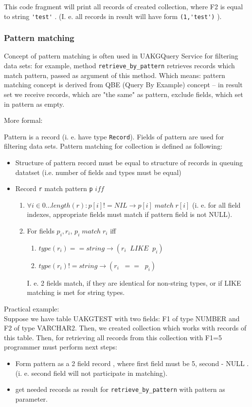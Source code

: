  This code fragment will print all records of created collection, where
F2 is equal to string \verb|'test'| . (I. e. all records in result will
have form \verb|(1,'test')| ).


\subsubsection{ Pattern matching }
 \label{patterns}

 Concept of pattern matching is often used in UAKGQuery Service for filtering
 data sets: for example, method \verb|retrieve_by_pattern| retrieves records
 which  match pattern, passed as argument of this method. Which means:
 pattern matching concept is derived from QBE (Query By Example) concept --
 in result set we receive records, which are "the same" as pattern, exclude
 fields, which set in pattern as empty.

More formal:

 Pattern is a record (i. e. have type \verb|Record|). Fields of pattern are
used for filtering data sets. 
Pattern matching for collection is defined as following:
\begin{itemize}
 \item Structure of pattern record  must be equal to structure of records in queuing datatset (i.e. number of fields and types must be equal)
 \item Record \verb|r| match pattern \verb|p| $iff$
 \begin{enumerate}
   \item $\forall i \in 0\dots length(r): p[i]!=NIL \rightarrow p[i]\; match \;r[i]$
    (i. e. for all field indexes, appropriate fields must match if pattern 
 field is not NULL).
   \item For fields $p_i,r_i$, $p_i\; match \;r_i$ iff
    \begin{enumerate}
       \item $type(r_i)==string \rightarrow (r_i\;\;LIKE\;\;p_i)$ 
       \item $type(r_i)!=string \rightarrow (r_i\;\;==\;\;p_i)$ 
    \end{enumerate}
    I. e. 2 fields match, if they are identical for non-string types, or
    if  LIKE matching is met for string types.
 \end{enumerate}
\end{itemize}

Practical example:\\

Suppose we have table UAKGTEST with two fields: F1 of type NUMBER and F2 of type VARCHAR2.
Then, we created collection which works with records of this table.
Then, for retrieving all records from this collection with F1=5 programmer must perform next steps:
\begin{itemize}
 \item Form pattern as a 2 field record , where first field must be 5, second - NULL . (i. e. second field  will not participate in matching).
 \item get needed records as result for \verb|retrieve_by_pattern| with pattern as parameter.
\end{itemize}

